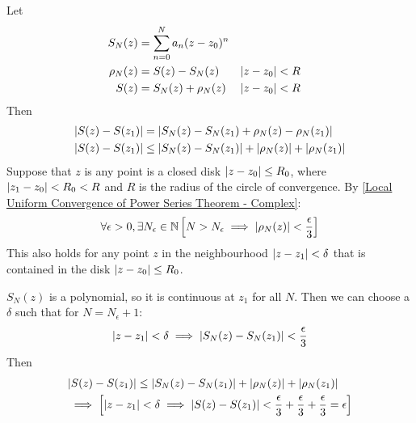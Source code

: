 \documentclass[12pt, english]{book}
\makeatletter
\renewenvironment{proof}[1][\proofname]{\par
	\pushQED{\qed}%
	\normalfont \topsep6\p@\@plus6\p@\relax
	\list{}{%
		\settowidth{\leftmargin}{\itshape\proofname:\hskip\labelsep}%
		\setlength{\labelwidth}{0pt}%
		\setlength{\itemindent}{-\leftmargin}%
		}%
	\item[\hskip\labelsep\itshape#1\@addpunct{:}]\ignorespaces
	}{\popQED\endlist\@endpefalse}
\makeatother
\begin{document}
	\begin{proof}
		Let 
		\begin{align*}
			S_N(z) &= \sum_{n=0}^{N} a_n(z-z_0)^n \\
			\rho_N(z) &= S(z) - S_N(z) & \abs{z-z_0} &< R \\
			S(z) &= S_N(z) + \rho_N(z) & \abs{z-z_0} &< R
		\end{align*}
		Then 
		\begin{align*}
			\abs{S(z) - S(z_1)} &= \abs{S_N(z) - S_N(z_1) + \rho_N(z) - \rho_N(z_1)} \\
			\abs{S(z) - S(z_1)} &\leq \abs{S_N(z) - S_N(z_1)}+ \abs{\rho_N(z)} + \abs{\rho_N(z_1)}
		\end{align*}
		Suppose that \(z\) is any point is a closed disk \(\abs{z-z_0}\leq R_0\), where \(\abs{z_1 - z_0} < R_0 < R\) and \(R\) is the radius of the circle of convergence. By \cref{Local Uniform Convergence of Power Series Theorem - Complex}:
		\begin{align*}
			\forall \epsilon > 0, \exists N_\epsilon \in \mathbb{N}
			\left[ N > N_\epsilon \implies \abs{\rho_N(z)} < \frac{\epsilon}{3} \right]
		\end{align*}
		This also holds for any point \(z\) in the neighbourhood \(\abs{z-z_1}<\delta\) that is contained in the disk \(\abs{z-z_0}\leq R_0\).
		
		\(S_N(z)\) is a polynomial, so it is continuous at \(z_1\) for all \(N\). Then we can choose a \(\delta\) such that for \(N = N_\epsilon + 1\):
		\begin{align*}
			\abs{z-z_1} < \delta \implies \abs{S_N(z) - S_N(z_1)} < \frac{\epsilon}{3}
		\end{align*}
		Then 
		\begin{align*}
			&\abs{S(z) - S(z_1)} \leq \abs{S_N(z) - S_N(z_1)}+ \abs{\rho_N(z)} + \abs{\rho_N(z_1)} \\
			&\implies \left[ \abs{z-z_1} < \delta \implies \abs{S(z) - S(z_1)} < \frac{\epsilon}{3} + \frac{\epsilon}{3} + \frac{\epsilon}{3} = \epsilon \right]
		\end{align*}
	\end{proof}
\end{document}
